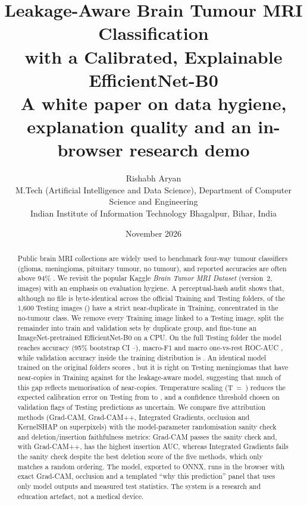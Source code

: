 \documentclass[11pt,a4paper]{article}
\title{\textbf{Leakage-Aware Brain Tumour MRI Classification\\with a Calibrated, Explainable EfficientNet-B0}\\[4pt]\large A white paper on data hygiene, explanation quality and an in-browser research demo}
\author{Rishabh Aryan\\[2pt]
\small M.Tech (Artificial Intelligence and Data Science), Department of Computer Science and Engineering\\
\small Indian Institute of Information Technology Bhagalpur, Bihar, India}
\date{November 2026}
\begin{document}
\maketitle

\begin{abstract}
\noindent Public brain MRI collections are widely used to benchmark four-way tumour classifiers (glioma, meningioma, pituitary tumour, no tumour), and reported accuracies are often above 94\% \citep{deepak2019,swati2019,badza2020}. We revisit the popular Kaggle \emph{Brain Tumor MRI Dataset} (version~2, \DNImages{} images) with an emphasis on evaluation hygiene. A perceptual-hash audit shows that, although no file is byte-identical across the official Training and Testing folders, \DTestImgWithTrainDupStrict{} of the 1{,}600 Testing images (\StrictDupPct{}) have a strict near-duplicate in Training, concentrated in the no-tumour class. We remove every Training image linked to a Testing image, split the remainder into train and validation sets by duplicate group, and fine-tune an ImageNet-pretrained EfficientNet-B0 on a CPU. On the full Testing folder the model reaches \AccCFull{} accuracy (95\% bootstrap CI \AccLoCFull{}--\AccHiCFull{}), macro-F1 \FOneCFull{} and macro one-vs-rest ROC-AUC \AUCC{}, while validation accuracy inside the training distribution is \ValAccC{}. An identical model trained on the original folders scores \AccNFull{}, but it is right on \LBNMeningiomaDup{} Testing meningiomas that have near-copies in Training against \LBCMeningiomaDup{} for the leakage-aware model, suggesting that much of this gap reflects memorisation of near-copies. Temperature scaling (T~=~\TempC{}) reduces the expected calibration error on Testing from \ECERawC{} to \ECECalC{}, and a confidence threshold chosen on validation flags \UncRateC{} of Testing predictions as uncertain. We compare five attribution methods (Grad-CAM, Grad-CAM++, Integrated Gradients, occlusion and KernelSHAP on superpixels) with the model-parameter randomisation sanity check and deletion/insertion faithfulness metrics: Grad-CAM passes the sanity check and, with Grad-CAM++, has the highest insertion AUC, whereas Integrated Gradients fails the sanity check despite the best deletion score of the five methods, which only matches a random ordering. The model, exported to ONNX, runs in the browser with exact Grad-CAM, occlusion and a templated ``why this prediction'' panel that uses only model outputs and measured test statistics. The system is a research and education artefact, not a medical device.
\end{abstract}
\end{document}
